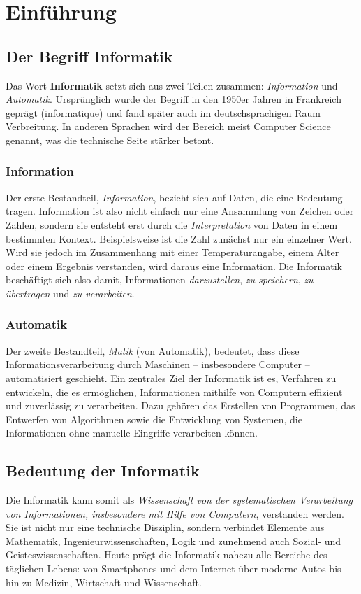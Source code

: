 \documentclass[../skript/main.tex]{subfiles}
\begin{document}
	
\chapter{Einführung}\label{chap:einfuehrung}
\section{Der Begriff Informatik}

Das Wort \textbf{Informatik} setzt sich aus zwei Teilen zusammen: \emph{Information} und \emph{Automatik}. 
Ursprünglich wurde der Begriff in den 1950er Jahren in Frankreich geprägt 
(\glqq informatique\grqq{}) und fand später auch im deutschsprachigen Raum Verbreitung. 
In anderen Sprachen wird der Bereich meist \glqq Computer Science\grqq{} genannt, 
was die technische Seite stärker betont. 

\subsection{Information}
Der erste Bestandteil, \emph{Information}, bezieht sich auf Daten, die eine Bedeutung tragen. 
Information ist also nicht einfach nur eine Ansammlung von Zeichen oder Zahlen, 
sondern sie entsteht erst durch die \emph{Interpretation} von Daten in einem bestimmten Kontext.  
Beispielsweise ist die Zahl \grqq{} zunächst nur ein einzelner Wert.
Wird sie jedoch im Zusammenhang mit einer Temperaturangabe, einem Alter oder einem Ergebnis verstanden, wird daraus eine Information.  
Die Informatik beschäftigt sich also damit, Informationen \emph{darzustellen}, 
\emph{zu speichern}, \emph{zu übertragen} und \emph{zu verarbeiten}.

\subsection{Automatik}
Der zweite Bestandteil, \emph{Matik} (von Automatik), bedeutet, dass diese Informationsverarbeitung 
durch Maschinen – insbesondere Computer – automatisiert geschieht.  
Ein zentrales Ziel der Informatik ist es, Verfahren zu entwickeln, die es ermöglichen, 
Informationen mithilfe von Computern effizient und zuverlässig zu verarbeiten. 
Dazu gehören das Erstellen von Programmen, das Entwerfen von Algorithmen 
sowie die Entwicklung von Systemen, die Informationen ohne manuelle Eingriffe verarbeiten können.

\section{Bedeutung der Informatik}
Die Informatik kann somit als \emph{Wissenschaft von der systematischen Verarbeitung von Informationen, insbesondere mit Hilfe von Computern}, verstanden werden. 
Sie ist nicht nur eine technische Disziplin, sondern verbindet Elemente aus 
Mathematik, Ingenieurwissenschaften, Logik und zunehmend auch Sozial- und Geisteswissenschaften. 
Heute prägt die Informatik nahezu alle Bereiche des täglichen Lebens: 
von Smartphones und dem Internet über moderne Autos bis hin zu Medizin, Wirtschaft und Wissenschaft.
\end{document}
